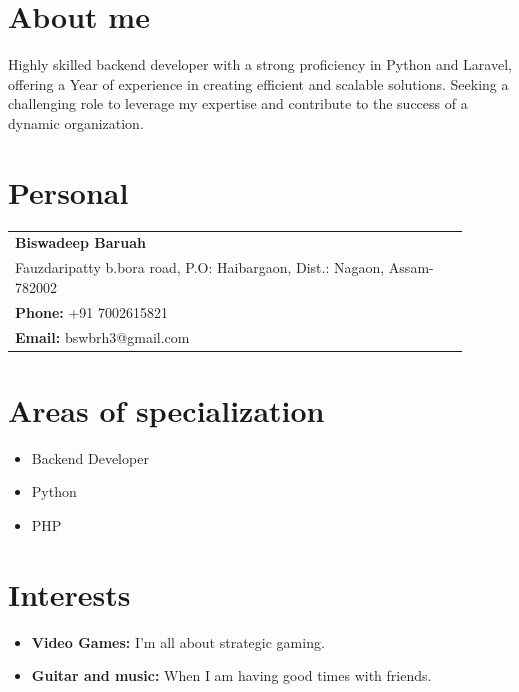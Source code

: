 \documentclass[10pt,a4paper]{article}
\begin{document}
\begin{paracol}{2}
\begin{leftcolumn}

\section*{About me}
\textcolor{textgrey}{
Highly skilled backend developer with a strong proficiency in Python and Laravel, offering a Year of experience in creating efficient and scalable solutions. Seeking a challenging role to leverage my expertise and contribute to the success of a dynamic organization.
}

\section*{Personal}
\textcolor{textgrey}{
\begin{tabular}{@{}p{0.9\linewidth}}
    \textbf{Biswadeep Baruah} \\
    Fauzdaripatty b.bora road, P.O: Haibargaon, Dist.: Nagaon, Assam-782002 \\
    \textbf{Phone:} +91 7002615821 \\
    \textbf{Email:} bswbrh3@gmail.com \\
\end{tabular}
}

\section*{Areas of specialization}
\textcolor{textgrey}{
\begin{itemize}
    \item Backend Developer
    \item Python
    \item PHP
\end{itemize}
}

\section*{Interests}
\textcolor{textgrey}{
\begin{itemize}
    \item \textbf{Video Games:} I’m all about strategic gaming.
    \item \textbf{Guitar and music:} When I am having good times with friends.
\end{itemize}
}


\end{leftcolumn}
\end{paracol}
\end{document}
